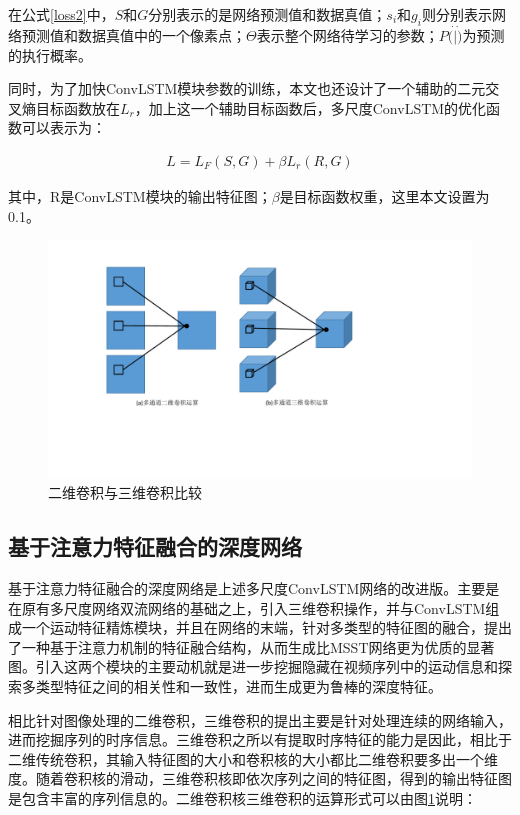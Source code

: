 在公式\ref{loss2}中，$S$和$G$分别表示的是网络预测值和数据真值；$s_i$和$g_i$则分别表示网络预测值和数据真值中的一个像素点；$\Theta$表示整个网络待学习的参数；$P(\dot|\dot)$为预测的执行概率。

同时，为了加快ConvLSTM模块参数的训练，本文也还设计了一个辅助的二元交叉熵目标函数放在$L_r$，加上这一个辅助目标函数后，多尺度ConvLSTM的优化函数可以表示为：

\begin{equation}
 \label{loss3}
 \begin{aligned}
   L = L_F(S,G) + \beta L_r(R,G)
   \end{aligned}
\end{equation}

其中，R是ConvLSTM模块的输出特征图；$\beta$是目标函数权重，这里本文设置为0.1。

\begin{figure}
\includegraphics[width=15cm]{figures/2D3Dconv}
\caption{二维卷积与三维卷积比较}
\label{2d3dconv}
\end{figure}

\subsection{基于注意力特征融合的深度网络}
基于注意力特征融合的深度网络是上述多尺度ConvLSTM网络的改进版。主要是在原有多尺度网络双流网络的基础之上，引入三维卷积操作，并与ConvLSTM组成一个运动特征精炼模块，并且在网络的末端，针对多类型的特征图的融合，提出了一种基于注意力机制的特征融合结构，从而生成比MSST网络更为优质的显著图。引入这两个模块的主要动机就是进一步挖掘隐藏在视频序列中的运动信息和探索多类型特征之间的相关性和一致性，进而生成更为鲁棒的深度特征。

相比针对图像处理的二维卷积，三维卷积的提出主要是针对处理连续的网络输入，进而挖掘序列的时序信息。三维卷积之所以有提取时序特征的能力是因此，相比于二维传统卷积，其输入特征图的大小和卷积核的大小都比二维卷积要多出一个维度。随着卷积核的滑动，三维卷积核即依次序列之间的特征图，得到的输出特征图是包含丰富的序列信息的。二维卷积核三维卷积的运算形式可以由图\ref{2d3dconv}说明：

